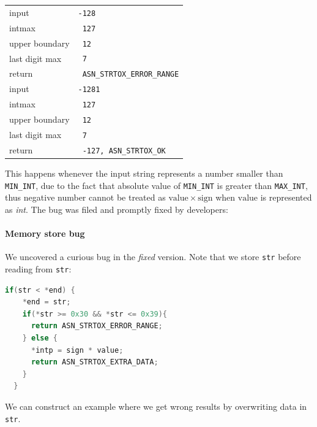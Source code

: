 \documentclass[acmsmall,nonacm]{acmart}
\begin{document}
\begin{tabular}{|l|l|}
 \hline
input & \texttt{-128} \\
intmax & \texttt{\ 127}\\
upper boundary& \texttt{\ 12} \\
last digit max& \texttt{\ 7}\\
return & \color{green}\texttt{\ ASN\_STRTOX\_ERROR\_RANGE}\\
\hline 
input & \texttt{-1281} \\
intmax & \texttt{\ 127}\\
upper boundary& \texttt{\ 12} \\
last digit max& \texttt{\ 7}\\
return & \color{red}\texttt{\ -127, ASN\_STRTOX\_OK}\\
\hline
    \end{tabular}

 
This happens whenever the input string represents a number smaller than \texttt{MIN\_INT}, due to the fact that absolute value of \texttt{MIN\_INT} is greater than \texttt{MAX\_INT}, thus negative number cannot be treated as $\mathrm{value}\times\mathrm{sign}$ when $\mathrm{value}$ is represented as \textit{int}. The bug  was filed and promptly fixed by developers:

   
  

  
  \paragraph{Memory store bug}
  We uncovered a curious bug in the \emph{fixed} version. Note that we
  store \texttt{str} before reading from \texttt{str}:

\begin{lstlisting}[language=C]
  if(str < *end) {
    *end = str;
    if(*str >= 0x30 && *str <= 0x39){
      return ASN_STRTOX_ERROR_RANGE;
    } else {
      *intp = sign * value;
      return ASN_STRTOX_EXTRA_DATA;
    }
  }
\end{lstlisting}
  
     We can construct an example where we get wrong results by overwriting data in \texttt{str}.

  
\end{document}
